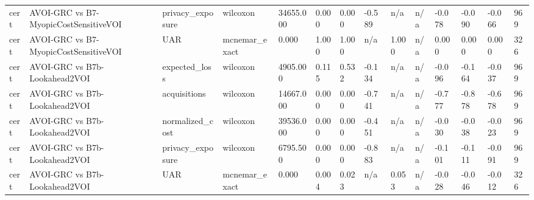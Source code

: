 \begin{table}[!ht]
{\begin{tabular}{llllllllllllll}
cert & AVOI-GRC vs B7-MyopicCostSensitiveVOI & privacy\_exposure & wilcoxon & 34655.000 & 0.000 & 0.000 & -0.589 & n/a & n/a & -0.078 & -0.090 & -0.066 & 969 \\
cert & AVOI-GRC vs B7-MyopicCostSensitiveVOI & UAR & mcnemar\_exact & 0.000 & 1.000 & 1.000 & n/a & 1.000 & n/a & 0.000 & 0.000 & 0.000 & 326 \\
cert & AVOI-GRC vs B7b-Lookahead2VOI & expected\_loss & wilcoxon & 4905.000 & 0.115 & 0.532 & -0.134 & n/a & n/a & -0.096 & -0.164 & -0.037 & 969 \\
cert & AVOI-GRC vs B7b-Lookahead2VOI & acquisitions & wilcoxon & 14667.000 & 0.000 & 0.000 & -0.741 & n/a & n/a & -0.777 & -0.878 & -0.678 & 969 \\
cert & AVOI-GRC vs B7b-Lookahead2VOI & normalized\_cost & wilcoxon & 39536.000 & 0.000 & 0.000 & -0.451 & n/a & n/a & -0.030 & -0.038 & -0.023 & 969 \\
cert & AVOI-GRC vs B7b-Lookahead2VOI & privacy\_exposure & wilcoxon & 6795.500 & 0.000 & 0.000 & -0.883 & n/a & n/a & -0.101 & -0.111 & -0.091 & 969 \\
cert & AVOI-GRC vs B7b-Lookahead2VOI & UAR & mcnemar\_exact & 0.000 & 0.004 & 0.023 & n/a & 0.053 & n/a & -0.028 & -0.046 & -0.012 & 326 \\
\bottomrule
\end{tabular}}
\end{table}
